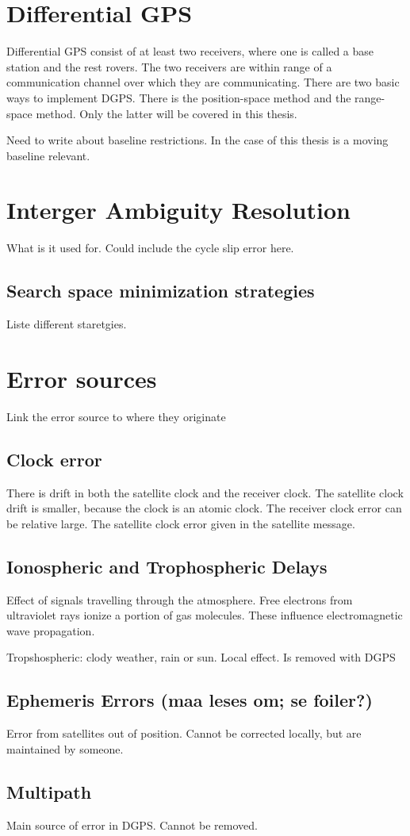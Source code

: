 \section{Differential GPS}
Differential GPS consist of at least two receivers, where one is called a base station and the rest rovers. The two receivers are within range of a communication channel over which they are communicating. There are two basic ways to implement DGPS. There is the position-space method and the range-space method. Only the latter will be covered in this thesis.

Need to write about baseline restrictions. In the case of this thesis is a moving baseline relevant. 
\section{Interger Ambiguity Resolution}
What is it used for. Could include the cycle slip error here.
\subsection{Search space minimization strategies}
Liste different staretgies.
\section{Error sources}
Link the error source to where they originate
\subsection{Clock error}
There is drift in both the satellite clock and the receiver clock. The satellite clock drift is smaller, because the clock is an atomic clock. The receiver clock error can be relative large. The satellite clock error given in the satellite message. 
\subsection{Ionospheric and Trophospheric Delays}
Effect of signals travelling through the atmosphere. Free electrons from ultraviolet rays ionize a portion of gas molecules. These influence electromagnetic wave propagation.

Tropshospheric: clody weather, rain or sun. Local effect. Is removed with DGPS
\subsection{Ephemeris Errors (maa leses om; se foiler?)}
Error from satellites out of position. Cannot be corrected locally, but are maintained by someone.
\subsection{Multipath}
Main source of error in DGPS. Cannot be removed. 
\cleardoublepage